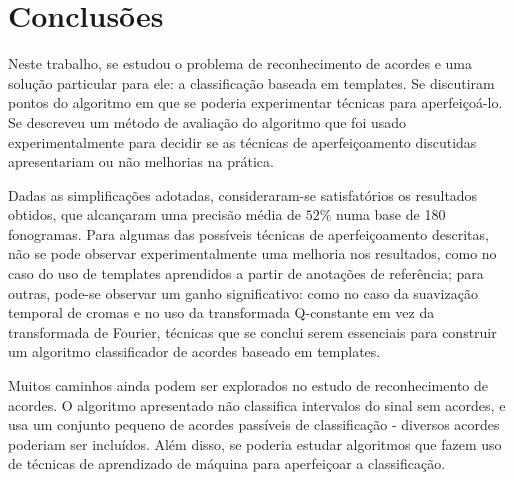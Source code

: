 \chapter{Conclusões}
\label{cap:conclusoes}

    Neste trabalho, se estudou o problema de reconhecimento de acordes e uma solução particular para ele: a classificação baseada em templates. Se discutiram pontos do algoritmo em que se poderia experimentar técnicas para aperfeiçoá-lo. Se descreveu um método de avaliação do algoritmo que foi usado experimentalmente para decidir se as técnicas de aperfeiçoamento discutidas apresentariam ou não melhorias na prática.
    
    Dadas as simplificações adotadas, consideraram-se satisfatórios os resultados obtidos, que alcançaram uma precisão média de ${52}\%$ numa base de 180 fonogramas. Para algumas das possíveis técnicas de aperfeiçoamento descritas, não se pode observar experimentalmente uma melhoria nos resultados, como no caso do uso de templates aprendidos a partir de anotações de referência; para outras, pode-se observar um ganho significativo: como no caso da suavização temporal de cromas e no uso da transformada Q-constante em vez da transformada de Fourier, técnicas que se conclui serem essenciais para construir um algoritmo classificador de acordes baseado em templates.
    
    Muitos caminhos ainda podem ser explorados no estudo de reconhecimento de acordes. O algoritmo apresentado não classifica intervalos do sinal sem acordes, e usa um conjunto pequeno de acordes passíveis de classificação - diversos acordes poderiam ser incluídos. Além disso, se poderia estudar algoritmos que fazem uso de técnicas de aprendizado de máquina para aperfeiçoar a classificação.
